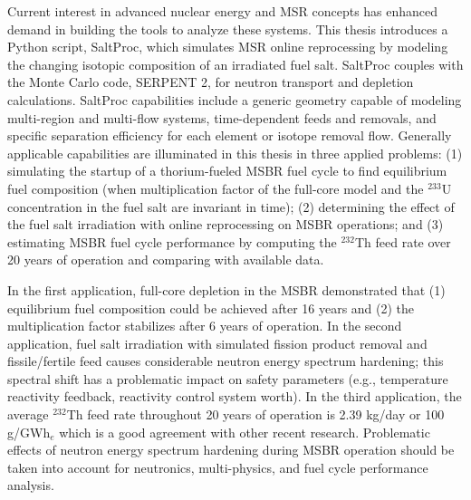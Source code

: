 \vspace{-0.2in}
Current interest in advanced nuclear energy and \gls{MSR} concepts has enhanced demand in building the tools to analyze these systems. This thesis introduces a Python script, SaltProc, which simulates \gls{MSR} online reprocessing by modeling the changing isotopic composition of an irradiated fuel salt. SaltProc couples with the Monte Carlo code, SERPENT 2, for neutron transport and depletion calculations. SaltProc capabilities include a generic geometry capable of modeling multi-region and multi-flow systems, time-dependent feeds and removals, and specific separation efficiency for each element or isotope removal flow. Generally applicable  capabilities are illuminated in this thesis in three applied problems: (1) simulating the startup of a thorium-fueled \gls{MSBR} fuel cycle to find equilibrium fuel composition (when multiplication factor of the full-core model and the $^{233}$U concentration in the fuel salt are invariant in time); (2) determining the effect of the fuel salt irradiation with online reprocessing on \gls{MSBR} operations; and (3) estimating \gls{MSBR} fuel cycle performance by computing the $^{232}$Th feed rate over 20 years of operation and comparing with available data.

In the first application, full-core depletion in the \gls{MSBR} demonstrated that (1) equilibrium fuel composition could be achieved after 16 years and (2) the multiplication factor stabilizes after 6 years of operation. In the second application, fuel salt irradiation with simulated fission product removal and fissile/fertile feed causes considerable neutron energy spectrum hardening; this spectral shift has a problematic impact on safety parameters (e.g., temperature reactivity feedback, reactivity control system worth). In the third application, the average $^{232}$Th feed rate throughout 20 years of operation is 2.39 kg/day or 100 g/GWh$_e$ which is a good agreement with other recent research. Problematic effects of neutron energy spectrum hardening during \gls{MSBR} operation should be taken into account for neutronics, multi-physics, and fuel cycle performance analysis.